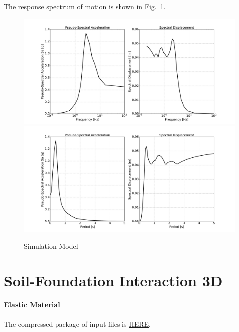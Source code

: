 The response spectrum of motion is shown in Fig.~\ref{fig_spectrum_freq_period_time_series_fr3d}.
\begin{figure}[H]
  \centering
  \includegraphics[width = 15cm]{./Figure-files/nonlinear_analysis_steps/free_field_3D/DRM3D_motion_node_4454_x_spectrum_freq.pdf}
  \includegraphics[width = 15cm]{./Figure-files/nonlinear_analysis_steps/free_field_3D/DRM3D_motion_node_4454_x_spectrum_period.pdf}
  \caption{Simulation Model}
  \label{fig_spectrum_freq_period_time_series_fr3d}
\end{figure}


\clearpage
\newpage
\section{Soil-Foundation Interaction 3D}
\label{foundation_3D}


\paragraph{Elastic Material}
The compressed package of input files is  
\href{https://github.com/yuan-energy/Real-ESSI-Short-Course-Examples/tree/master/short-course-examples/nonlinear_analysis_steps/soil-foundation/elastic/elastic.tgz?raw=true}{HERE}. 


